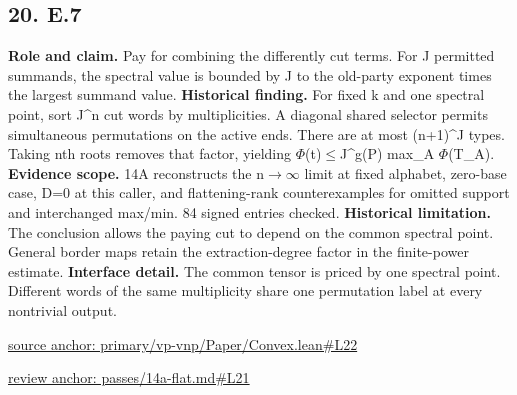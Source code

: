 \documentclass[11pt,letterpaper]{article}
\theoremstyle{definition}\newtheorem{definition}[theorem]{Definition}\newtheorem{example}[theorem]{Example}
\theoremstyle{remark}\newtheorem{remark}[theorem]{Remark}
\begin{document}
\subsection*{20. E.7}
\textbf{Role and claim.} Pay for combining the differently cut terms. For J permitted summands, the spectral value is bounded by J to the old-party exponent times the largest summand value.
\textbf{Historical finding.} For fixed k and one spectral point, sort J\textasciicircum{}n cut words by multiplicities. A diagonal shared selector permits simultaneous permutations on the active ends. There are at most (n+1)\textasciicircum{}J types. Taking nth roots removes that factor, yielding \ensuremath{\Phi}(t)\ensuremath{\le}J\textasciicircum{}g(P) max\_A \ensuremath{\Phi}(T\_A).
\textbf{Evidence scope.} 14A reconstructs the n\ensuremath{\to}\ensuremath{\infty} limit at fixed alphabet, zero-base case, D=0 at this caller, and flattening-rank counterexamples for omitted support and interchanged max/min. 84 signed entries checked.
\textbf{Historical limitation.} The conclusion allows the paying cut to depend on the common spectral point. General border maps retain the extraction-degree factor in the finite-power estimate.
\textbf{Interface detail.} The common tensor is priced by one spectral point. Different words of the same multiplicity share one permutation label at every nontrivial output.
\par\href{https://github.com/nousentllc/VP-VNP-Review/blob/8a7976933b6b2b4ffda1ad3a0dfb5fc6b6f023e8/primary/vp-vnp/Paper/Convex.lean\#L22}{source anchor: primary/vp-vnp/Paper/Convex.lean\#L22}
\par\href{https://github.com/nousentllc/VP-VNP-Review/blob/8a7976933b6b2b4ffda1ad3a0dfb5fc6b6f023e8/passes/14a-flat.md\#L21}{review anchor: passes/14a-flat.md\#L21}
\goodbreak
{}
\hypertarget{claim.21}{}
\end{document}
